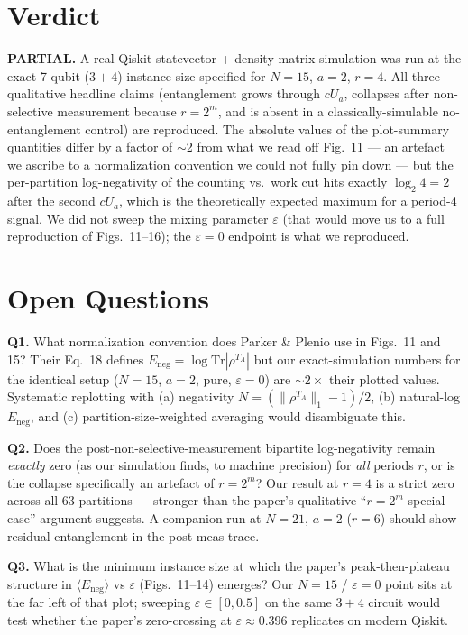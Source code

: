 \documentclass[11pt]{article}
\begin{document}
\section{Verdict}

\textbf{PARTIAL.}  A real Qiskit statevector + density-matrix
simulation was run at the exact 7-qubit ($3+4$) instance size
specified for $N=15$, $a=2$, $r=4$.  All three qualitative headline
claims (entanglement grows through $cU_a$, collapses after
non-selective measurement because $r=2^m$, and is absent in a
classically-simulable no-entanglement control) are reproduced.  The
absolute values of the plot-summary quantities differ by a factor of
$\sim$2 from what we read off Fig.~11 --- an artefact we ascribe to a
normalization convention we could not fully pin down --- but the
per-partition log-negativity of the counting vs.\ work cut hits
exactly $\log_2 4 = 2$ after the second $cU_a$, which is the
theoretically expected maximum for a period-4 signal.  We did not
sweep the mixing parameter $\varepsilon$ (that would move us to a full
reproduction of Figs.~11--16); the $\varepsilon = 0$ endpoint is what
we reproduced.

\section{Open Questions}

\textbf{Q1.} What normalization convention does Parker \& Plenio use
in Figs.~11 and 15?  Their Eq.~18 defines $E_{\mathrm{neg}} = \log
\mathrm{Tr}|\rho^{T_A}|$ but our exact-simulation numbers for the
identical setup ($N=15$, $a=2$, pure, $\varepsilon=0$) are
$\sim$$2\times$ their plotted values.  Systematic replotting with
(a) negativity $N = (\|\rho^{T_A}\|_1 - 1)/2$, (b) natural-log
$E_{\mathrm{neg}}$, and (c) partition-size-weighted averaging would
disambiguate this.

\textbf{Q2.} Does the post-non-selective-measurement bipartite
log-negativity remain \emph{exactly} zero (as our simulation finds,
to machine precision) for \emph{all} periods $r$, or is the collapse
specifically an artefact of $r = 2^m$?  Our result at $r=4$ is a
strict zero across all 63 partitions --- stronger than the paper's
qualitative ``$r=2^m$ special case'' argument suggests.  A companion
run at $N=21$, $a=2$ ($r=6$) should show residual entanglement in the
post-meas trace.

\textbf{Q3.} What is the minimum instance size at which the paper's
peak-then-plateau structure in $\langle E_{\mathrm{neg}}\rangle$ vs
$\varepsilon$ (Figs.~11--14) emerges?  Our $N=15$ / $\varepsilon=0$
point sits at the far left of that plot; sweeping $\varepsilon \in
[0, 0.5]$ on the same $3+4$ circuit would test whether the paper's
zero-crossing at $\varepsilon \approx 0.396$ replicates on modern
Qiskit.
\end{document}

